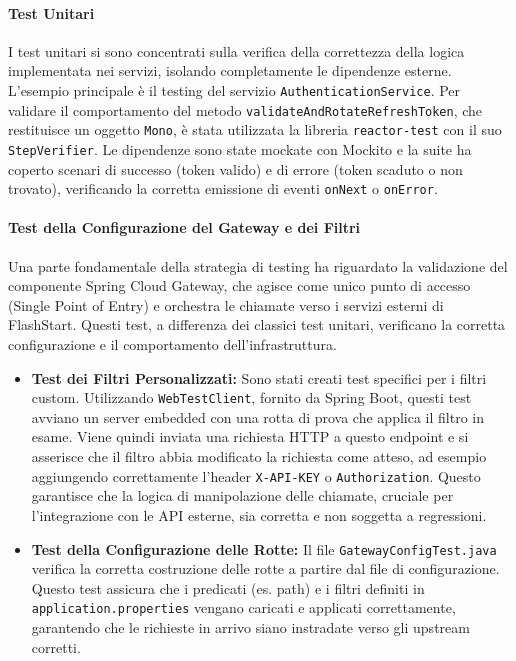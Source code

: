 \documentclass[12pt,a4paper,openright,twoside]{book}
\begin{document}
\paragraph{Test Unitari}
I test unitari si sono concentrati sulla verifica della correttezza della logica implementata nei servizi, isolando completamente le dipendenze esterne. L'esempio principale è il testing del servizio \texttt{AuthenticationService}. Per validare il comportamento del metodo \texttt{validateAndRotateRefreshToken}, che restituisce un oggetto \texttt{Mono}, è stata utilizzata la libreria \texttt{reactor-test} con il suo \texttt{StepVerifier}. Le dipendenze sono state mockate con Mockito e la suite ha coperto scenari di successo (token valido) e di errore (token scaduto o non trovato), verificando la corretta emissione di eventi \texttt{onNext} o \texttt{onError}.

\paragraph{Test della Configurazione del Gateway e dei Filtri}
Una parte fondamentale della strategia di testing ha riguardato la validazione del componente Spring Cloud Gateway, che agisce come unico punto di accesso (Single Point of Entry) e orchestra le chiamate verso i servizi esterni di FlashStart. Questi test, a differenza dei classici test unitari, verificano la corretta configurazione e il comportamento dell'infrastruttura.
\begin{itemize}
    \item \textbf{Test dei Filtri Personalizzati:} Sono stati creati test specifici per i filtri custom. Utilizzando \texttt{WebTestClient}, fornito da Spring Boot, questi test avviano un server embedded con una rotta di prova che applica il filtro in esame. Viene quindi inviata una richiesta HTTP a questo endpoint e si asserisce che il filtro abbia modificato la richiesta come atteso, ad esempio aggiungendo correttamente l'header \texttt{X-API-KEY} o \texttt{Authorization}. Questo garantisce che la logica di manipolazione delle chiamate, cruciale per l'integrazione con le API esterne, sia corretta e non soggetta a regressioni.
    \item \textbf{Test della Configurazione delle Rotte:} Il file \texttt{GatewayConfigTest.java} verifica la corretta costruzione delle rotte a partire dal file di configurazione. Questo test assicura che i predicati (es. path) e i filtri definiti in \texttt{application.properties} vengano caricati e applicati correttamente, garantendo che le richieste in arrivo siano instradate verso gli upstream corretti.
\end{itemize}
\end{document}
